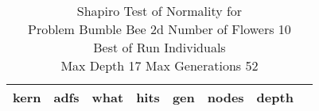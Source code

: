 \begin{table}[H]
\caption{Shapiro Test of Normality for \\ Problem  Bumble Bee 2d  Number of Flowers 10\\Best of Run Individuals \\ Max Depth 17 Max Generations 52\\}
\begin{center}
\scalebox{0.8} %
{
\begin{tabular}{lrrrrrrr}
\hline
kern & adfs & what & hits & gen & nodes & depth \\
\hline


\end{tabular}
}
\end{center}
\end{table}

